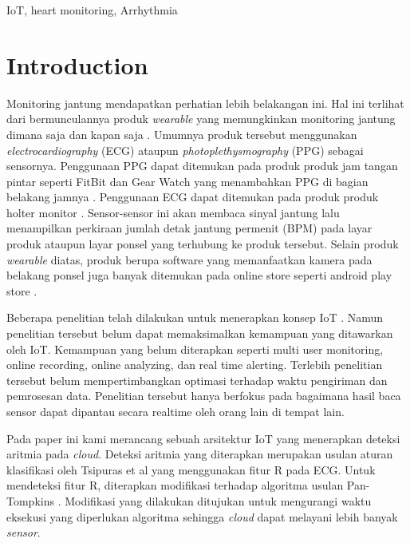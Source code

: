 \documentclass[conference]{IEEEtran}
\begin{document}
\bigskip
\begin{IEEEkeywords}
IoT, heart monitoring, Arrhythmia
\end{IEEEkeywords}

\section{Introduction}
Monitoring jantung mendapatkan perhatian lebih belakangan ini. Hal ini terlihat dari bermunculannya produk \textit{wearable} yang memungkinkan monitoring jantung dimana saja dan kapan saja \cite{online:fitbit, online:samsung_gear, online:endo_holter}. Umumnya produk tersebut menggunakan \textit{electrocardiography} (ECG) ataupun \textit{photoplethysmography} (PPG) sebagai sensornya. Penggunaan PPG dapat ditemukan pada produk produk jam tangan pintar seperti FitBit dan Gear Watch yang menambahkan PPG di bagian belakang jamnya \cite{online:fitbit, online:samsung_gear}. Penggunaan ECG dapat ditemukan pada produk produk holter monitor \cite{online:endo_holter}. Sensor-sensor ini akan membaca sinyal jantung lalu menampilkan perkiraan jumlah detak jantung permenit (BPM) pada layar produk ataupun layar ponsel yang terhubung ke produk tersebut. Selain produk \textit{wearable} diatas, produk berupa software yang memanfaatkan kamera pada belakang ponsel juga banyak ditemukan pada online store seperti android play store \cite{playstore_heart}.

Beberapa penelitian telah dilakukan untuk menerapkan konsep IoT \cite{daniel_barataa, paola_pierleoni, vasu_jindal, mamidi}. Namun penelitian tersebut belum dapat memaksimalkan kemampuan yang ditawarkan oleh IoT. Kemampuan yang belum diterapkan seperti multi user monitoring, online recording, online analyzing, dan real time alerting. Terlebih penelitian tersebut belum mempertimbangkan optimasi terhadap waktu pengiriman dan pemrosesan data. Penelitian tersebut hanya berfokus pada bagaimana hasil baca sensor dapat dipantau secara realtime oleh orang lain di tempat lain.

Pada paper ini kami merancang sebuah arsitektur IoT yang menerapkan deteksi aritmia pada \textit{cloud}. Deteksi aritmia yang diterapkan merupakan usulan aturan klasifikasi oleh Tsipuras et al \cite{tsipouras} yang menggunakan fitur R pada ECG. Untuk mendeteksi fitur R, diterapkan modifikasi terhadap algoritma usulan Pan-Tompkins \cite{pantom}. Modifikasi yang dilakukan ditujukan untuk mengurangi waktu eksekusi yang diperlukan algoritma sehingga \textit{cloud} dapat melayani lebih banyak \textit{sensor}.
\end{document}
